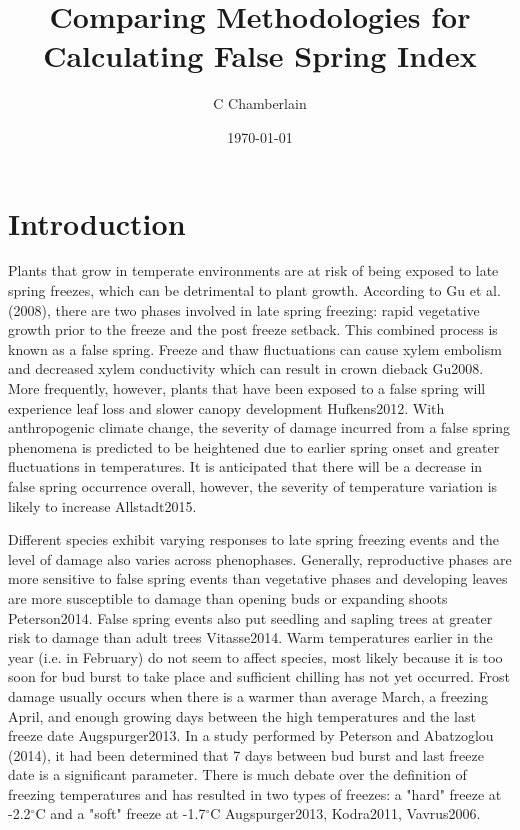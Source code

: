 \documentclass{article}\usepackage[]{graphicx}\usepackage[]{color}
\begin{document}
\title{Comparing Methodologies for Calculating False Spring Index}
\author{C Chamberlain}
\date{\today}
\maketitle 

\renewcommand{\thetable}{\arabic{table}}
\renewcommand{\thefigure}{\arabic{figure}}
\renewcommand{\labelitemi}{$-$}
\section{Introduction}

Plants that grow in temperate environments are at risk of being exposed to late spring freezes, which can be detrimental to plant growth. According to Gu et al. (2008), there are two phases involved in late spring freezing: rapid vegetative growth prior to the freeze and the post freeze setback. This combined process is known as a false spring. Freeze and thaw fluctuations can cause xylem embolism and decreased xylem conductivity which can result in crown dieback {Gu2008}. More frequently, however, plants that have been exposed to a false spring will experience leaf loss and slower canopy development {Hufkens2012}. With anthropogenic climate change, the severity of damage incurred from a false spring phenomena is predicted to be heightened due to earlier spring onset and greater fluctuations in temperatures. It is anticipated that there will be a decrease in false spring occurrence overall, however, the severity of temperature variation is likely to increase {Allstadt2015}. 

Different species exhibit varying responses to late spring freezing events and the level of damage also varies across phenophases. Generally, reproductive phases are more sensitive to false spring events than vegetative phases and developing leaves are more susceptible to damage than opening buds or expanding shoots {Peterson2014}. False spring events also put seedling and sapling trees at greater risk to damage than adult trees {Vitasse2014}. Warm temperatures earlier in the year (i.e. in February) do not seem to affect species, most likely because it is too soon for bud burst to take place and sufficient chilling has not yet occurred. Frost damage usually occurs when there is a warmer than average March, a freezing April, and enough growing days between the high temperatures and the last freeze date {Augspurger2013}. In a study performed by Peterson and Abatzoglou (2014), it had been determined that 7 days between bud burst and last freeze date is a significant parameter. There is much debate over the definition of freezing temperatures and has resulted in two types of freezes: a "hard" freeze at -2.2$^{\circ}$C and a "soft" freeze at -1.7$^{\circ}$C {Augspurger2013, Kodra2011, Vavrus2006}.
\end{document}
